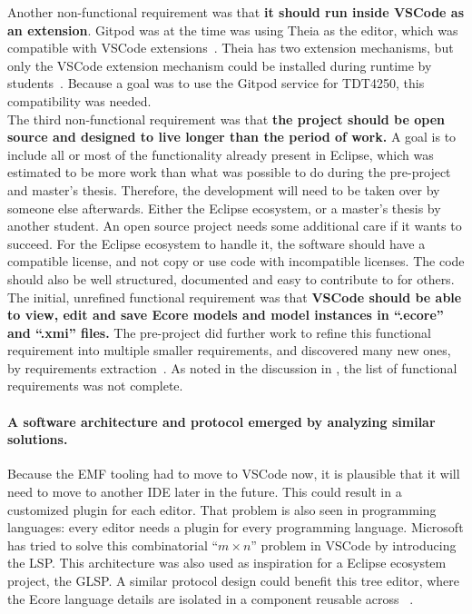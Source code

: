 Another non-functional requirement was that \textbf{it should run inside \gls{VSCode} as an extension}.
Gitpod was at the time was using \gls{Theia} as the editor, which was compatible with \gls{VSCode} extensions~\cite{rekstadModelingEnvironmentCloud2020}.
\Gls{Theia} has two extension mechanisms, but only the \gls{VSCode} extension mechanism could be installed during runtime by students~\cite{rekstadModelingEnvironmentCloud2020}.
Because a goal was to use the Gitpod service for \gls{TDT4250}, this compatibility was needed.\\

The third non-functional requirement was that \textbf{the project should be \gls{open source} and designed to live longer than the period of work.}
A goal is to include all or most of the functionality already present in \gls{Eclipse}, which was estimated to be more work than what was possible to do during the pre-project and master's thesis.
Therefore, the development will need to be taken over by someone else afterwards.
Either the Eclipse ecosystem, or a master's thesis by another student.
An \gls{open source} project needs some additional care if it wants to succeed.
For the Eclipse ecosystem to handle it, the software should have a compatible license, and not copy or use code with incompatible licenses.
The code should also be well structured, documented and easy to contribute to for others.\\

The initial, unrefined functional requirement was that \textbf{\gls{VSCode} should be able to view, edit and save \gls{Ecore} models and model instances in ``.ecore'' and ``.xmi'' files.}
The pre-project did further work to refine this functional requirement into multiple smaller requirements, and discovered many new ones, by requirements extraction~\cite[p.~47,48]{rekstadModelingEnvironmentCloud2020}.
As noted in the discussion in \cite[p.~51]{rekstadModelingEnvironmentCloud2020}, the list of functional requirements was not complete.


\paragraph{A software architecture and protocol emerged by analyzing similar solutions.}
Because the \acrshort{EMF} tooling had to move to \gls{VSCode} now, it is plausible that it will need to move to another \acrshort{IDE} later in the future.
This could result in a customized plugin for each editor.
That problem is also seen in programming languages: every editor needs a plugin for every programming language.
Microsoft has tried to solve this combinatorial ``\(m{\times}n\)'' problem in \gls{VSCode} by introducing the \acrfull{LSP}.
This architecture was also used as inspiration for a Eclipse ecosystem project, the \acrfull{GLSP}.
A similar protocol design could benefit this tree editor, where the \gls{Ecore} language details are isolated in a component reusable across ~\cite{rekstadModelingEnvironmentCloud2020}.\\

